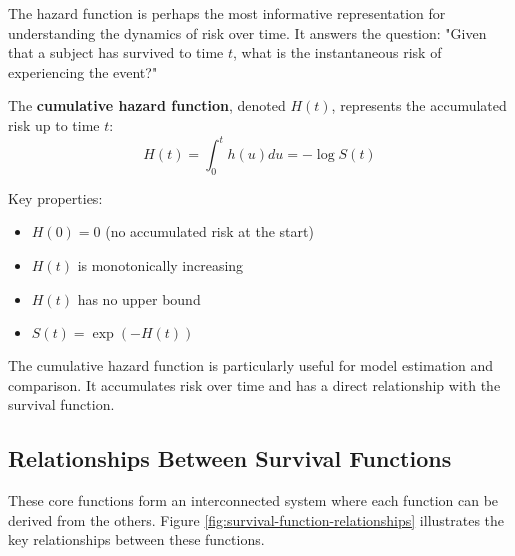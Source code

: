 The hazard function is perhaps the most informative representation for understanding the dynamics of risk over time. It answers the question: "Given that a subject has survived to time $t$, what is the instantaneous risk of experiencing the event?"

\begin{definitionbox}[title=Cumulative Hazard Function]
The \textbf{cumulative hazard function}, denoted $H(t)$, represents the accumulated risk up to time $t$:
\begin{equation}
    H(t) = \int_0^t h(u)du = -\log S(t)
\end{equation}

Key properties:
\begin{itemize}
    \item $H(0) = 0$ (no accumulated risk at the start)
    \item $H(t)$ is monotonically increasing
    \item $H(t)$ has no upper bound
    \item $S(t) = \exp(-H(t))$
\end{itemize}
\end{definitionbox}

The cumulative hazard function is particularly useful for model estimation and comparison. It accumulates risk over time and has a direct relationship with the survival function.

\subsection{Relationships Between Survival Functions}

These core functions form an interconnected system where each function can be derived from the others. Figure \ref{fig:survival-function-relationships} illustrates the key relationships between these functions.

